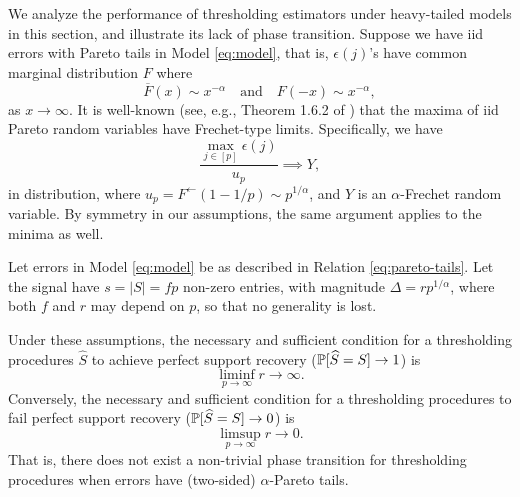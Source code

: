 We analyze the performance of thresholding estimators under heavy-tailed models in this section, and illustrate its lack of phase transition.
Suppose we have iid errors with Pareto tails in Model \eqref{eq:model}, that is, $\epsilon(j)$'s have common marginal distribution $F$ where
\begin{equation} \label{eq:pareto-tails}
    \overline{F}(x) \sim x^{-\alpha} \quad \text{and} \quad F(-x) \sim x^{-\alpha},    
\end{equation}
as $x\to\infty$. 
It is well-known (see, e.g., Theorem 1.6.2 of \citep{leadbetter2012extremes}) that the maxima of iid Pareto random variables have Frechet-type limits.
Specifically, we have
\begin{equation} \label{eq:Frechet-limit-1}
    \frac{\max_{j\in[p]}\epsilon(j)}{u_p} \implies Y,
\end{equation}
in distribution, where $u_p = F^{\leftarrow}(1-1/p)\sim p^{1/\alpha}$, and $Y$ is an $\alpha$-Frechet random variable. By symmetry in our assumptions, the same argument applies to the minima as well.

\begin{theorem} \label{thm:heavy-tails}
Let errors in Model \eqref{eq:model} be as described in Relation \eqref{eq:pareto-tails}.
Let the signal have $s = |S| = fp$ non-zero entries, with magnitude $\Delta = rp^{1/\alpha}$, where both $f$ and $r$ may depend on $p$, so that no generality is lost.

Under these assumptions, the necessary and sufficient condition for a thresholding procedures $\widehat{S}$ to achieve perfect support recovery ($\P[\widehat{S}=S]\to1$) is 
$$
\liminf_{p\to\infty} r\to\infty.
$$
Conversely, the necessary and sufficient condition  for a thresholding procedures to fail perfect support recovery ($\P[\widehat{S}=S]\to0$) is 
$$
\limsup_{p\to\infty} r\to 0.
$$
That is, there does not exist a non-trivial phase transition for thresholding procedures when errors have (two-sided) $\alpha$-Pareto tails.
\end{theorem}

